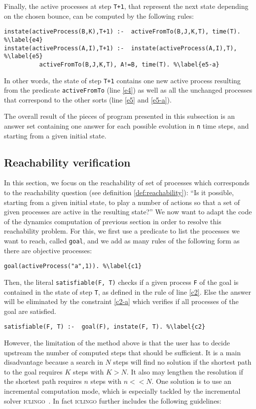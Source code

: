 Finally, the active processes at step \texttt{T+1},
that represent the next state depending on the chosen bounce,
can be computed by the following rules:
\begin{lstlisting}
instate(activeProcess(B,K),T+1) :-  activeFromTo(B,J,K,T), time(T). %\label{e4}
instate(activeProcess(A,I),T+1) :-  instate(activeProcess(A,I),T), %\label{e5}
          activeFromTo(B,J,K,T), A!=B, time(T). %\label{e5-a}
\end{lstlisting}
In other words, the state of step \texttt{T+1} contains one new active process
resulting from the predicate \texttt{activeFromTo} (line \ref{e4})
as well as all the unchanged processes that correspond to the other sorts (line \ref{e5} and \ref{e5-a}).

The overall result of the pieces of program presented in this subsection
is an answer set containing one answer for each
possible evolution in \texttt{n} time steps,
and starting from a given initial state.

\subsection{Reachability verification}
In this section, we focus on the reachability of set of processes which corresponds to the reachability question (see definition \ref{def:reachability}):
“Is it possible, starting from a given initial state, to play a number of actions so that a set of given processes are active in the resulting state?”
We now want to adapt the code of the dynamics computation of previous section in order to resolve this reachability problem.
For this, we first use a predicate to list the processes we want to reach, called \texttt{goal}, and we add as many rules of the following form as there are objective processes:
\begin{lstlisting}
goal(activeProcess("a",1)). %\label{c1}
\end{lstlisting}
Then, the literal \texttt{satisfiable(F, T)} 
checks if a given process \texttt{F} of the goal
is contained in the state of step \texttt{T},
as defined in the rule of line \ref{c2}.
Else the answer will be eliminated by the constraint \ref{c2-a} which verifies if all processes of the goal are satisfied.
\begin{lstlisting}
satisfiable(F, T) :-  goal(F), instate(F, T). %\label{c2}
\end{lstlisting}

However, the limitation of the method above is that the user has to decide upstream
the number of computed steps that should be sufficient.
It is a main disadvantage because a search in $N$ steps will find no solution
if the shortest path to the goal requires $K$ steps with $K > N$. It also may lengthen the resolution if the shortest path requires $n$ steps with $n << N$.
One solution is to use an incremental computation mode,
which is especially tackled by the incremental solver \textsc{iclingo}~\cite{gebser2008user}. In fact \textsc{iclingo} further includes the following guidelines:

